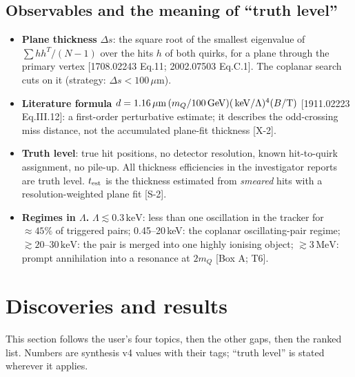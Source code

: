 \documentclass[11pt,a4paper]{article}
\newcommand{\mQ}{m_Q}
\newcommand{\GeV}{\ensuremath{\,\mathrm{GeV}}}
\newcommand{\keV}{\ensuremath{\,\mathrm{keV}}}
\newcommand{\MeV}{\ensuremath{\,\mathrm{MeV}}}
\newcommand{\um}{\ensuremath{\,\mu\mathrm{m}}}
\newcommand{\Ds}{\Delta s}
\newcommand{\src}[1]{{\color{mid}[#1]}}
\begin{document}
\subsection{Observables and the meaning of ``truth level''}
\begin{itemize}
\item \textbf{Plane thickness} $\Ds$: the square root of the smallest eigenvalue of $\sum h h^T/(N-1)$ over the hits $h$ of both quirks, for a plane through the primary vertex [1708.02243 Eq.11; 2002.07503 Eq.C.1]. The coplanar search cuts on it (strategy: $\Ds<100\um$).
\item \textbf{Literature formula} $d=1.16\um\,(\mQ/100\GeV)(\keV/\Lambda)^4(B/{\rm T})$ [1911.02223 Eq.III.12]: a first-order perturbative estimate; it describes the odd-crossing miss distance, not the accumulated plane-fit thickness \src{X-2}.
\item \textbf{Truth level}: true hit positions, no detector resolution, known hit-to-quirk assignment, no pile-up. All thickness efficiencies in the investigator reports are truth level. $t_{\rm est}$ is the thickness estimated from \emph{smeared} hits with a resolution-weighted plane fit \src{S-2}.
\item \textbf{Regimes in $\Lambda$.} $\Lambda\lesssim0.3\keV$: less than one oscillation in the tracker for $\approx45\%$ of triggered pairs; 0.45--20\,keV: the coplanar oscillating-pair regime; $\gtrsim20$--$30\keV$: the pair is merged into one highly ionising object; $\gtrsim3\MeV$: prompt annihilation into a resonance at $2\mQ$ \src{Box A; T6}.
\end{itemize}

\section{Discoveries and results}\label{sec:results}
This section follows the user's four topics, then the other gaps, then the ranked list. Numbers are synthesis v4 values with their tags; ``truth level'' is stated wherever it applies.
\end{document}
